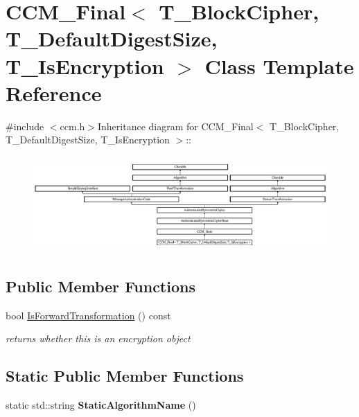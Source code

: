 \hypertarget{class_c_c_m___final}{
\section{CCM\_\-Final$<$ T\_\-BlockCipher, T\_\-DefaultDigestSize, T\_\-IsEncryption $>$ Class Template Reference}
\label{class_c_c_m___final}
}


 


{\ttfamily \#include $<$ccm.h$>$}Inheritance diagram for CCM\_\-Final$<$ T\_\-BlockCipher, T\_\-DefaultDigestSize, T\_\-IsEncryption $>$::\begin{figure}[H]
\begin{center}
\leavevmode
\includegraphics[height=3.67816cm]{class_c_c_m___final}
\end{center}
\end{figure}
\subsection*{Public Member Functions}
\begin{DoxyCompactItemize}
\item 
\hypertarget{class_c_c_m___final_a04f2f02393e72b5ea5241868968f9694}{
bool \hyperlink{class_c_c_m___final_a04f2f02393e72b5ea5241868968f9694}{IsForwardTransformation} () const }
\label{class_c_c_m___final_a04f2f02393e72b5ea5241868968f9694}

\begin{DoxyCompactList}\small\item\em returns whether this is an encryption object \item\end{DoxyCompactList}\end{DoxyCompactItemize}
\subsection*{Static Public Member Functions}
\begin{DoxyCompactItemize}
\item 
\hypertarget{class_c_c_m___final_a7b76e5f2b96c49fbcb6e170b32c336ec}{
static std::string {\bfseries StaticAlgorithmName} ()}
\label{class_c_c_m___final_a7b76e5f2b96c49fbcb6e170b32c336ec}

\end{DoxyCompactItemize}



